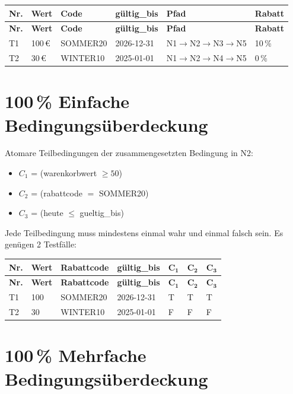 \documentclass[
	fontsize=12pt,          %
	paper=a4,               %
	numbers=noenddot,       %
	listof=totoc,           %
	listof=entryprefix,     %
	listof=nochaptergap,    %
	bibliography=totoc,     %
	parskip=half,           %
	openany                 %
]{scrbook}
\begin{document}
\begin{longtable}{| p{0.5cm} | p{1.2cm} | p{2.0cm} | p{2.0cm} | p{3.0cm} | p{1.5cm} |}
	\hline
	\textbf{Nr.} & \textbf{Wert} & \textbf{Code} & \textbf{gültig\_bis} & \textbf{Pfad} & \textbf{Rabatt} \\ \hline
	\endfirsthead
	\hline
	\textbf{Nr.} & \textbf{Wert} & \textbf{Code} & \textbf{gültig\_bis} & \textbf{Pfad} & \textbf{Rabatt} \\ \hline
	\endhead
	\hline
	\endfoot
	T1 & 100\,€ & SOMMER20 & 2026-12-31 & N1$\to$N2$\to$N3$\to$N5 & 10\,\% \\ \hline
	T2 & 30\,€ & WINTER10 & 2025-01-01 & N1$\to$N2$\to$N4$\to$N5 & 0\,\% \\ \hline
\end{longtable}

\section*{100\,\% Einfache Bedingungsüberdeckung}

Atomare Teilbedingungen der zusammengesetzten Bedingung in N2:
\begin{itemize}
	\item $C_1$ = (warenkorbwert $\geq 50$)
	\item $C_2$ = (rabattcode $=$ \glqq SOMMER20\grqq{})
	\item $C_3$ = (heute $\leq$ gueltig\_bis)
\end{itemize}

Jede Teilbedingung muss mindestens einmal wahr und einmal falsch sein.
Es genügen 2 Testfälle:

\begin{longtable}{| p{0.5cm} | p{1.3cm} | p{2.2cm} | p{2.0cm} | p{1.0cm} | p{1.0cm} | p{1.0cm} |}
	\hline
	\textbf{Nr.} & \textbf{Wert} & \textbf{Rabattcode} & \textbf{gültig\_bis} & $\mathbf{C_1}$ & $\mathbf{C_2}$ & $\mathbf{C_3}$ \\ \hline
	\endfirsthead
	\hline
	\textbf{Nr.} & \textbf{Wert} & \textbf{Rabattcode} & \textbf{gültig\_bis} & $\mathbf{C_1}$ & $\mathbf{C_2}$ & $\mathbf{C_3}$ \\ \hline
	\endhead
	\hline
	\endfoot
	T1 & 100 & SOMMER20 & 2026-12-31 & T & T & T \\ \hline
	T2 & 30 & WINTER10 & 2025-01-01 & F & F & F \\ \hline
\end{longtable}

\section*{100\,\% Mehrfache Bedingungsüberdeckung}
\end{document}

